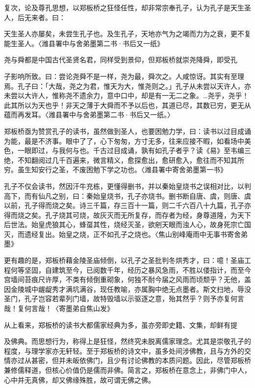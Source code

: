 复次，论及尊孔思想，以郑板桥之狂怪任性，却非常宗奉孔子，认为孔子是天生圣人，后无来者。曰：

\begin{BookQuote}
天生圣人亦屡矣，未尝生孔子也。及生孔子，天地亦气为之竭而力为之衰，更不复能生圣人。〈潍县署中与舍弟墨第二书·书后又一纸》
\end{BookQuote}

尧与舜都是中国古代圣贤名君，同样受到景仰，但郑板桥就崇尧降舜，即受孔

\vfill
\begin{BookNotes}
\end{BookNotes}

\noindent 子影响所致。曰：尝论尧舜不是一样，尧为最，舜次之。人咸惊讶。其实有至理焉。孔子曰：「大哉，尧之为君，惟天为大，惟尧则之。」孔子从未尝以天许人，亦未尝以大许人，惟称尧不遗余力，意中口中，却是有一无二之象。…尧乎，尧乎！此其所以为天也乎！非天之薄于大舜而不予以后也，其道已尽，其数已穷，更无从蕴而再发耳。〈潍县署中与舍弟墨第二书·书后又一纸。〉

郑板桥亟为赞赏孔子的读书，虽然做到圣人，也要困勉力学，曰：读书以过目成诵为能，最是不济事。眼中了了，心下匆匆，方寸无多，往来应接不暇，如看场中美色，一眼即过，与我何与也。千古过目成诵，孰有如孔子者乎？读《易》至韦编三绝，不知翻阅过几千百遍来，微言精义，愈探愈出，愈研愈入，愈往而不知其所穷。虽生知安行之圣，不废困勉下学之功也。〈潍县署中寄舍弟墨第一书》

孔子不仅会读书，然因汗牛充栋，更懂得删书，并以秦始皇烧书之误相对比，以判高下，而有仙凡之别，曰：秦始皇烧书，孔子亦烧书。删书断自唐、虞，则唐、虞以前，孔子得而烧之矣。诗三千篇，存三百十一篇，则二千六百八十九篇，孔子亦得而烧之矣。孔子烧其可烧，故灰灭而无所复存，而存者为经，身尊道隆，为天下后世法。始皇虎狼其心，蜂虿其性，烧经灭圣，欲剜天眼而浊人心，故身死宗亡国灭，而遗经复出。始皇之烧，正不如孔子之烧也。〈焦山别峰庵雨中无事书寄舍弟墨》

更有趣的是，郑板桥藉金陵圣庙倾倒，以孔子之圣批判冬烘秀才，曰：噫！圣庙工程何等坚固，自建筑至今，已阅数千年，经历之暴风急雨，不胜以偻指计，而至今宫墙间苔痕尺许厚，不类有倾倒重砌象，何独不耐今届之风雨而顷颓乎？无他，盖因金陵城中龌龊秀才满坑满谷，现任教喻，亦属胸中绝无点墨者。斯文扫地，辱没圣门，孔子岂容若辈列门墙，故特毁墙以示驱逐之意，殆其然乎？则予亦复何言哉！复何言哉！〈寄墨弟自焦山发》

从上看来，郑板桥的读书大都儒家经典为多，虽亦旁即史籍、文集，却鲜有提


\noindent 及佛典。而思想行为，称得上是狂怪，然终究未脱离儒家理念。尤其是崇敬孔子的程度，与理学家亦无轩轻。至于郑板桥的诗文中，虽多处间涉佛教，且与方外的交情亦过从甚密，但并未皈依佛门，且少有讨论佛教的本质问题。因此，尽管郑板桥兼修儒释道，但核心价值仍是儒而非佛。简言之，郑板桥在意念上，非佛门中人，心中并无真佛，却又佛缘殊胜，故可谓无佛之佛。

